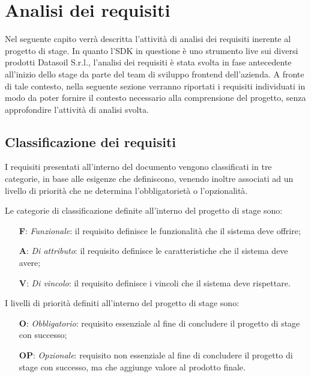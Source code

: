\chapter{Analisi dei requisiti}
\label{chap:analisi-requisiti}
Nel seguente capito verrà descritta l'attività di analisi dei requisiti inerente al progetto di stage. \newline
In quanto l'SDK in questione è uno strumento live sui diversi prodotti Datasoil S.r.l., l'analisi dei requisiti è stata svolta
in fase antecedente all'inizio dello stage da parte del team di sviluppo frontend dell'azienda. \newline
A fronte di tale contesto, nella seguente sezione verranno riportati i requisiti individuati in modo da poter fornire il contesto
necessario alla comprensione del progetto, senza approfondire l'attività di analisi svolta.

\section{Classificazione dei requisiti}
I requisiti presentati all'interno del documento vengono classificati in tre categorie, in base alle esigenze che definiscono, venendo inoltre
associati ad un livello di priorità che ne determina l'obbligatorietà o l'opzionalità. \newline

\newline
Le categorie di classificazione definite all'interno del progetto di stage sono:

\begin{itemize}
    \item[\textbf{F}:] \textit{Funzionale}: il requisito definisce le funzionalità che il sistema deve offrire;
    \item[\textbf{A}:] \textit{Di attributo}: il requisito definisce le caratteristiche che il sistema deve avere;
    \item[\textbf{V}:] \textit{Di vincolo}: il requisito definisce i vincoli che il sistema deve rispettare.
\end{itemize}

\newline
I livelli di priorità definiti all'interno del progetto di stage sono:

\begin{itemize}
    \item[\textbf{O}:] \textit{Obbligatorio}: requisito essenziale al fine di concludere il progetto di stage con successo;
    \item[\textbf{OP}:] \textit{Opzionale}: requisito non essenziale al fine di concludere il progetto di stage con successo, ma che aggiunge valore al prodotto finale.
\end{itemize}


